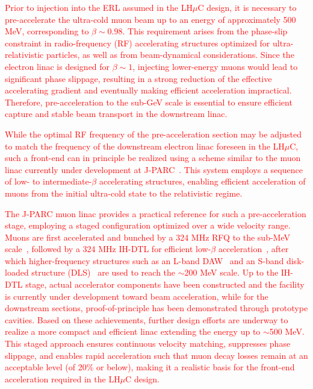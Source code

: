 \documentclass[a4paper,11pt]{article}
\begin{document}
\textcolor{red}{
Prior to injection into the ERL assumed in the LH$\mu$C design, it is necessary to pre-accelerate the ultra-cold muon beam up to an energy of approximately 500 MeV, corresponding to $\beta \sim 0.98$. This requirement arises from the phase-slip constraint in radio-frequency (RF) accelerating structures optimized for ultra-relativistic particles, as well as from beam-dynamical considerations. Since the electron linac is designed for $\beta \sim 1$, injecting lower-energy muons would lead to significant phase slippage, resulting in a strong reduction of the effective accelerating gradient and eventually making efficient acceleration impractical. Therefore, pre-acceleration to the sub-GeV scale is essential to ensure efficient capture and stable beam transport in the downstream linac. 
}
\par
\textcolor{red}{
While the optimal RF frequency of the pre-acceleration section may be adjusted to match the frequency of the downstream electron linac foreseen in the LH$\mu$C, such a front-end can in principle be realized using a scheme similar to the muon linac currently under development at J-PARC~\cite{Otani:22:PTEP}. This system employs a sequence of low- to intermediate-$\beta$ accelerating structures, enabling efficient acceleration of muons from the initial ultra-cold state to the relativistic regime.
}
\par
\textcolor{red}{
The J-PARC muon linac provides a practical reference for such a pre-acceleration stage, employing a staged configuration optimized over a wide velocity range. Muons are first accelerated and bunched by a 324 MHz RFQ to the sub-MeV scale~\cite{Kondo:15:IPAC}, followed by a 324 MHz IH-DTL for efficient low-$\beta$ acceleration~\cite{Nakazawa:22:PRAB}, after which higher-frequency structures such as an L-band DAW~\cite{Otani:19:JPCS} and an S-band disk-loaded structure (DLS)~\cite{Sumi:23:JPCS} are used to reach the $\sim$200 MeV scale. Up to the IH-DTL stage, actual accelerator components have been constructed and the facility is currently under development toward beam acceleration, while for the downstream sections, proof-of-principle has been demonstrated through prototype cavities. Based on these achievements, further design efforts are underway to realize a more compact and efficient linac extending the energy up to $\sim$500 MeV. This staged approach ensures continuous velocity matching, suppresses phase slippage, and enables rapid acceleration such that muon decay losses remain at an acceptable level (of 20\% or below), making it a realistic basis for the front-end acceleration required in the LH$\mu$C design.
}
\end{document}
